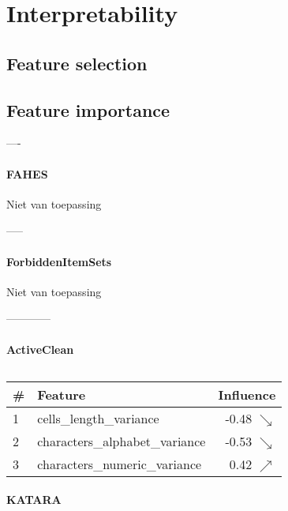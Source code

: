 \section{Interpretability}
\subsection{Feature selection}



\subsection{Feature importance}

----

\paragraph{FAHES}

Niet van toepassing

-----

\paragraph{ForbiddenItemSets}

Niet van toepassing

------------

\paragraph{ActiveClean}

\begin{table}[H]
\centering
\begin{tabular}{llr}
\toprule
 \# &                         Feature &         Influence \\
\midrule
 1 &         cells\_length\_variance &  -0.48 $\searrow$ \\
 2 &  characters\_alphabet\_variance &  -0.53 $\searrow$ \\
 3 &   characters\_numeric\_variance &   0.42 $\nearrow$ \\
\bottomrule
\end{tabular}
\caption{}
\end{table}


\paragraph{KATARA}

